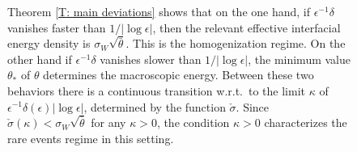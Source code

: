 \documentclass[12pt]{amsart}
\edef\x{\pgfmathresult}%
\begin{document}
\begin{figure}

\centering

	
\caption{Theorem \ref{T: main deviations} shows that on the one hand, if $ \epsilon^{-1} \delta $ vanishes faster than $1/|\log \epsilon|$, then the relevant effective interfacial energy density is $\sigma_{W} \sqrt{\bar{\theta} }$.  This is the homogenization regime.  On the other hand if $ \epsilon^{-1} \delta $ vanishes slower than $1/|\log \epsilon|$, the minimum value $\theta_{*}$ of $\theta$ determines the macroscopic energy. Between these two behaviors there is a continuous transition w.r.t.~to the limit $\kappa$ of $\epsilon^{-1} \delta(\epsilon) |\log \epsilon |$, determined by the function $\check{\sigma}$.  Since $\check{\sigma}(\kappa) < \sigma_{W} \sqrt{ \bar{\theta} }$ for any $\kappa > 0$, the condition $\kappa > 0$ characterizes the rare events regime in this setting.}

\label{fig01}

\end{figure}
\end{document}
